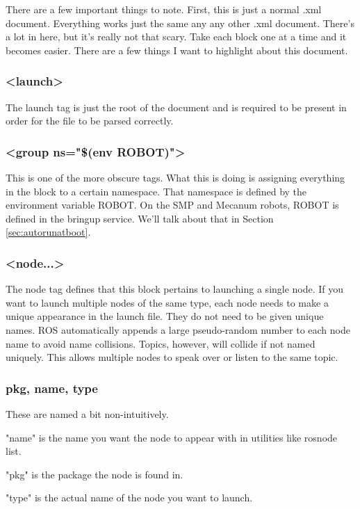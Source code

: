 There are a few important things to note. First, this is just a normal .xml document. Everything works just the same any any other .xml document. There's a lot in here, but it's really not that scary. Take each block one at a time and it becomes easier. There are a few things I want to highlight about this document.

\subsubsection{<launch>}

The launch tag is just the root of the document and is required to be present in order for the file to be parsed correctly. 

\subsubsection{<group ns="\$(env ROBOT)">}

This is one of the more obscure tags. What this is doing is assigning everything in the block to a certain namespace. That namespace is defined by the environment variable ROBOT. On the SMP and Mecanum robots, ROBOT is defined in the bringup service. We'll talk about that in Section \ref{sec:autorunatboot}.

\subsubsection{<node...>}

The node tag defines that this block pertains to launching a single node. If you want to launch multiple nodes of the same type, each node needs to make a unique appearance in the launch file. They do not need to be given unique names. ROS automatically appends a large pseudo-random number to each node name to avoid name collisions. Topics, however, will collide if not named uniquely. This allows multiple nodes to speak over or listen to the same topic.

\subsubsection{pkg, name, type}

These are named a bit non-intuitively.

"name" is the name you want the node to appear with in utilities like rosnode list.
 
"pkg" is the package the node is found in.
 
"type" is the actual name of the node you want to launch.
 
